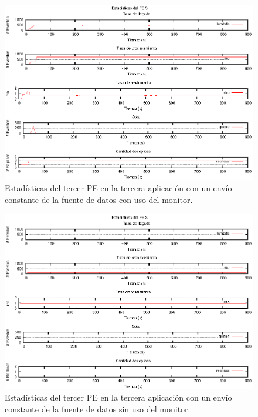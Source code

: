\begin{figure}[!hptb]
\centering
    \includegraphics[scale=1.1]{images/exp/app3/cm/logical/statusThreePE.eps}
    \caption{Estadísticas del tercer PE en la tercera aplicación con un envío constante de la fuente de datos con uso del monitor.}
    \label{fig:app3-statusThreePE-cm}
\end{figure}

\begin{figure}[!hptb]
\centering
    \includegraphics[scale=1.1]{images/exp/app3/sm/logical/statusThreePE.eps}
    \caption{Estadísticas del tercer PE en la tercera aplicación con un envío constante de la fuente de datos sin uso del monitor.}
    \label{fig:app3-statusThreePE-sm}
\end{figure}

\vspace*{15cm}